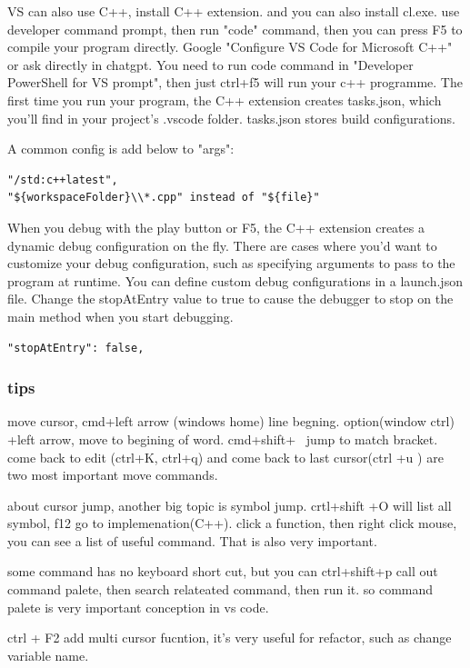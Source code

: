 \documentclass[paper=8.5in:11in, twoside, 12pt, pagesize=pdftex]{book}
\begin{document}
VS can also use C++, install C++ extension. and you can also install cl.exe. use developer command prompt, then run "code" command, then you can press F5 to compile your program directly.   Google "Configure VS Code for Microsoft C++" or ask directly in chatgpt. You need to run code command in "Developer PowerShell for VS prompt", then just ctrl+f5 will run your c++ programme. The first time you run your program, the C++ extension creates tasks.json, which you'll find in your project's .vscode folder. tasks.json stores build configurations.

A common config is add below to "args":
\begin{lstlisting}
"/std:c++latest", 
"${workspaceFolder}\\*.cpp" instead of "${file}"
\end{lstlisting}

When you debug with the play button or F5, the C++ extension creates a dynamic debug configuration on the fly. There are cases where you'd want to customize your debug configuration, such as specifying arguments to pass to the program at runtime. You can define custom debug configurations in a launch.json file. Change the stopAtEntry value to true to cause the debugger to stop on the main method when you start debugging.
\begin{lstlisting}
"stopAtEntry": false,
\end{lstlisting}

\subsubsection{tips}
	
move cursor, cmd+left arrow (windows home)  line begning.  option(window ctrl) +left arrow, move to begining of word. cmd+shift+ \ jump to match bracket.  come back to edit (ctrl+K, ctrl+q) and come back to last cursor(ctrl +u ) are two most important move commands. 
	
about cursor jump, another big topic is symbol jump. crtl+shift +O will list all symbol,  f12 go to implemenation(C++). click a function, then right click mouse, you can see a list of useful command.  That is also very important. 
	
some command has no keyboard short cut, but you can ctrl+shift+p call out command palete, then search relateated command, then run it.  so command palete is very important conception in vs code. 
	
ctrl + F2 add multi cursor fucntion, it's very useful for refactor, such as change variable name. 
	
\end{document}
